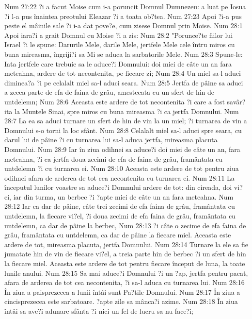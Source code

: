 Num 27:22  ?i a facut Moise cum i-a poruncit Domnul Dumnezeu: a luat pe Iosua ?i l-a pus înaintea preotului Eleazar ?i a toata ob?tea.
Num 27:23  Apoi ?i-a pus peste el mâinile sale ?i i-a dat pove?e, cum zisese Domnul prin Moise.
Num 28:1  Apoi iara?i a grait Domnul cu Moise ?i a zis:
Num 28:2  "Porunce?te fiilor lui Israel ?i le spune: Darurile Mele, darile Mele, jertfele Mele cele întru miros cu buna mireasma, îngriji?i sa Mi se aduca la sarbatorile Mele.
Num 28:3  Spune-le: Iata jertfele care trebuie sa le aduce?i Domnului: doi miei de câte un an fara meteahna, ardere de tot necontenita, pe fiecare zi;
Num 28:4  Un miel sa-l aduci diminea?a ?i pe celalalt miel sa-l aduci seara.
Num 28:5  Jertfa de pâine sa aduci a zecea parte de efa de faina de grâu, amestecata cu un sfert de hin de untdelemn;
Num 28:6  Aceasta este ardere de tot necontenita ?i care a fost savâr?ita la Muntele Sinai, spre miros cu buna mireasma ?i ca jertfa Domnului.
Num 28:7  La ea sa aduci turnare un sfert de hin de vin la un miel; ?i turnarea de vin a Domnului s-o torni la loc sfânt.
Num 28:8  Celalalt miel sa-l aduci spre seara, cu darul lui de pâine ?i cu turnarea lui sa-l aduca jertfa, mireasma placuta Domnului.
Num 28:9  Iar în ziua odihnei sa aduce?i doi miei de câte un an, fara meteahna, ?i ca jertfa doua zecimi de efa de faina de grâu, framântata cu untdelemn ?i cu turnarea ei.
Num 28:10  Aceasta este ardere de tot pentru ziua odihnei afara de arderea de tot cea necontenita cu turnarea ei.
Num 28:11  La începutul lunilor voastre sa aduce?i Domnului ardere de tot: din cireada, doi vi?ei, iar din turma, un berbec ?i ?apte miei de câte un an fara meteahna.
Num 28:12  Iar ca dar de pâine, câte trei zecimi de efa faina de grâu, framântata cu untdelemn, la fiecare vi?el, ?i doua zecimi de efa faina de grâu, framântata cu untdelemn, ca dar de pâine la berbec,
Num 28:13  ?i câte o zecime de efa faina de grâu, framântata cu untdelemn, ca dar de pâine la fiecare miel. Aceasta este ardere de tot, mireasma placuta, jertfa Domnului.
Num 28:14  Turnare la ele sa fie jumatate hin de vin de fiecare vi?el, a treia parte hin de berbec ?i un sfert de hin la fiecare miel. Aceasta este ardere de tot pentru fiecare început de luna, la toate lunile anului.
Num 28:15  Sa mai aduce?i Domnului ?i un ?ap, jertfa pentru pacat, afara de arderea de tot cea necontenita, ?i sa-l aduca cu turnarea lui.
Num 28:16  În ziua a paisprezecea a lunii întâi sunt Pa?tile Domnului.
Num 28:17  În ziua a cincisprezecea este sarbatoare. ?apte zile sa mânca?i azime.
Num 28:18  În ziua întâi sa ave?i adunare sfânta ?i nici un fel de lucru sa nu face?i;
